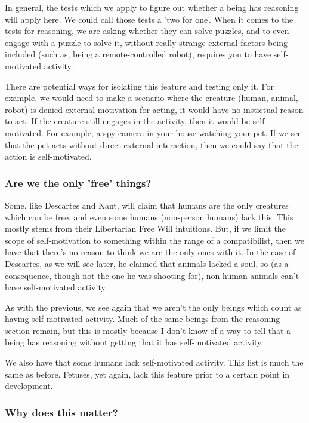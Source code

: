 In general, the tests which we apply to figure out whether a being has reasoning will apply here. We could call those tests a 'two for one'. When it comes to the tests for reasoning, we are asking whether they can solve puzzles, and to even engage with a puzzle to solve it, without really strange external factors being included (such as, being a remote-controlled robot), requires you to have self-motivated activity.

There are potential ways for isolating this feature and testing only it. For example, we would need to make a scenario where the creature (human, animal, robot) is denied external motivation for acting, it would have no instictual reason to act. If the creature still engages in the activity, then it would be self motivated. For example, a spy-camera in your house watching your pet. If we see that the pet acts without direct external interaction, then we could say that the action is self-motivated. 


\subsubsection{Are we the only 'free' things?}

Some, like Descartes and Kant, will claim that humans are the only creatures which can be free, and even some humans (non-person humans) lack this. This mostly stems from their Libertarian Free Will intuitions. But, if we limit the scope of self-motivation to something within the range of a compatibilist, then we have that there's no reason to think we are the only ones with it. In the case of Descartes, as we will see later, he claimed that animals lacked a soul, so (as a consequence, though not the one he was shooting for), non-human animals can't have self-motivated activity. 

As with the previous, we see again that we aren't the only beings which count as having self-motivated activity. Much of the same beings from the reasoning section remain, but this is mostly because I don't know of a way to tell that a being has reasoning without getting that it has self-motivated activity.

We also have that some humans lack self-motivated activity. This list is much the same as before. Fetuses, yet again, lack this feature prior to a certain point in development.

\subsubsection{Why does this matter?}


